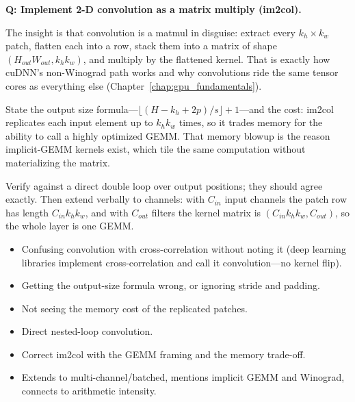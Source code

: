 \begin{interviewq}
\textbf{Q: Implement 2-D convolution as a matrix multiply (im2col).}

 \quad {} \quad \badgefreq{\freqlow}

\stronganswer

The insight is that convolution is a matmul in disguise: extract every $k_h \times k_w$ patch, flatten each into a row, stack them into a matrix of shape $(H_{out}W_{out}, k_hk_w)$, and multiply by the flattened kernel. That is exactly how cuDNN's non-Winograd path works and why convolutions ride the same tensor cores as everything else (Chapter~\ref{chap:gpu_fundamentals}).

State the output size formula---$\lfloor (H - k_h + 2p)/s \rfloor + 1$---and the cost: im2col replicates each input element up to $k_hk_w$ times, so it trades memory for the ability to call a highly optimized GEMM. That memory blowup is the reason implicit-GEMM kernels exist, which tile the same computation without materializing the matrix.

Verify against a direct double loop over output positions; they should agree exactly. Then extend verbally to channels: with $C_{in}$ input channels the patch row has length $C_{in}k_hk_w$, and with $C_{out}$ filters the kernel matrix is $(C_{in}k_hk_w, C_{out})$, so the whole layer is one GEMM.

\redflags
\begin{itemize}
    \item Confusing convolution with cross-correlation without noting it (deep learning libraries implement cross-correlation and call it convolution---no kernel flip).
    \item Getting the output-size formula wrong, or ignoring stride and padding.
    \item Not seeing the memory cost of the replicated patches.
\end{itemize}


\goodgreat
\begin{itemize}
    \item {} Direct nested-loop convolution.
    \item {} Correct im2col with the GEMM framing and the memory trade-off.
    \item {} Extends to multi-channel/batched, mentions implicit GEMM and Winograd, connects to arithmetic intensity.
\end{itemize}

\end{interviewq}


